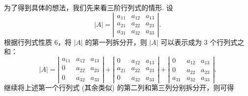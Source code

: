 \documentclass[UTF8, 12pt, fontset=fandol, oneside]{ctexart}
\begin{document}
为了得到具体的想法，我们先来看三阶行列式的情形. 设
\[
|A|=
\left|\begin{array}{ccc}
a_{11} & a_{12} & a_{13}\\
a_{21} & a_{22} & a_{23}\\
a_{31} & a_{32} & a_{33}
\end{array}\right|.
\]
根据行列式性质 6，将 $|A|$ 的第一列拆分开，则 $|A|$ 可以表示成为 3 个行列式之和：
\[
|A|=
\left|\begin{array}{ccc}
a_{11} & a_{12} & a_{13}\\
0 & a_{22} & a_{23}\\
0 & a_{32} & a_{33}
\end{array}\right|
+
\left|\begin{array}{ccc}
0 & a_{12} & a_{13}\\
a_{21} & a_{22} & a_{23}\\
0 & a_{32} & a_{33}
\end{array}\right|
+
\left|\begin{array}{ccc}
0 & a_{12} & a_{13}\\
0 & a_{22} & a_{23}\\
a_{31} & a_{32} & a_{33}
\end{array}\right|.
\]
继续将上述第一个行列式 (其余类似) 的第二列和第三列分别拆分开，则可得
\end{document}
